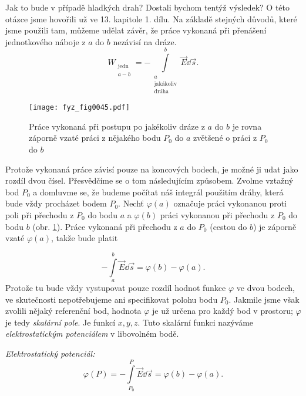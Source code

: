     Jak to bude v případě hladkých drah? Dostali bychom tentýž výsledek? O této otázce jsme 
    hovořili už ve 13. kapitole 1. dílu. Na základě stejných důvodů, které jsme použili tam, můžeme 
    udělat závěr, že práce vykonaná při přenášení jednotkového náboje z \(a\) do \(b\) nezávisí na 
    dráze.   
    \begin{equation*}
      W_{\substack{\text{jedn}\\ a-b}} = 
       - \int\limits_{\substack{a\\\text{jakákoliv}\\\text{dráha}}}^b\vec{E}\dd{\vec{s}}.
    \end{equation*}      

    \begin{figure}[ht!]  %
      \centering
      \texttt{[image: fyz\_fig0045.pdf]}
      \caption{Práce vykonaná při postupu po jakékoliv dráze z \(a\) do \(b\) je rovna záporně     
        vzaté práci z nějakého bodu \(P_0\) do \(a\) zvětšené o práci z \(P_0\) do \(b\)}
      \label{fyz:fig0045}
    \end{figure}
    Protože vykonaná práce závisí pouze na koncových bodech, je možné ji udat jako rozdíl dvou 
    čísel. Přesvědčíme se o tom následujícím způsobem. Zvolme vztažný bod \(P_0\) a domluvme se, že 
    budeme počítat náš integrál použitím dráhy, která bude vždy procházet bodem \(P_0\). Nechť 
    \(\varphi(a)\) označuje práci vykonanou proti poli při přechodu z \(P_0\) do bodu \(a\) a 
    \(\varphi(b)\) práci vykonanou při přechodu z \(P_0\) do bodu \(b\) (obr. 
    \ref{fyz:fig0045}). Práce vykonaná při přechodu z \(a\) do \(P_0\) (cestou do \(b\)) 
    je záporně vzaté \(\varphi(a)\), takže bude platit

    \begin{equation}\label{fyz:fey_eq_elstat21}
     - \int\limits_{a}^{b}\vec{E}\dd{\vec{s}} = \varphi(b) - \varphi(a). 
    \end{equation}
    Protože tu bude vždy vystupovat pouze rozdíl hodnot funkce \(\varphi\) ve dvou bodech, ve 
    skutečnosti nepotřebujeme ani specifikovat polohu bodu \(P_0\). Jakmile jsme však zvolili 
    nějaký referenční bod, hodnota \(\varphi\) je už určena pro každý bod v prostoru; \(\varphi\) 
    je tedy \emph{skalární pole}. Je funkcí \(x, y, z\). Tuto skalární funkci nazýváme 
    \emph{elektrostatickým potenciálem} v libovolném bodě.

    \emph{Elektrostatický potenciál:}
     \begin{equation}\label{fyz:fey_eq_elstat22}
       \varphi(P) = - \int\limits_{P_0}^{P}\vec{E}\dd{\vec{s}} = \varphi(b) - \varphi(a). 
     \end{equation} 
    
